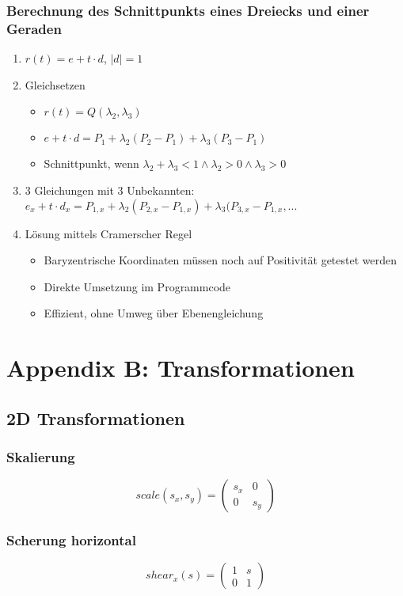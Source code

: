 \subsubsection{Berechnung des Schnittpunkts eines Dreiecks und einer Geraden}
\begin{enumerate}
	\item \(r(t) = e+t\cdot d\), \(|d|=1\)
	\item Gleichsetzen
	\begin{itemize}
		\item \(r(t) = Q(\lambda_2,\lambda_3)\)
		\item \(e+t\cdot d = P_1+\lambda_2(P_2-P_1)+\lambda_3(P_3-P_1)\)
		\item Schnittpunkt, wenn \(\lambda_2+\lambda_3<1 \wedge \lambda_2 > 0 \wedge \lambda_3 >0\)
	\end{itemize}
	\item 3 Gleichungen mit 3 Unbekannten: \(e_x+t\cdot d_x=P_{1,x}+\lambda_2(P_{2,x}-P_{1,x})+\lambda_3(P_{3,x}-P_{1,x},...\)
	\item Lösung mittels Cramerscher Regel
	\begin{itemize}
		\item Baryzentrische Koordinaten müssen noch auf Positivität getestet werden
		\item Direkte Umsetzung im Programmcode
		\item Effizient, ohne Umweg über Ebenengleichung
	\end{itemize}
\end{enumerate}



\section{Appendix B: Transformationen}

\subsection{2D Transformationen}

\subsubsection{Skalierung}
\[scale(s_x,s_y) = \begin{pmatrix} s_x & 0 \\ 0 & s_y \end{pmatrix}\]

\subsubsection{Scherung horizontal}
\[shear_x(s) = \begin{pmatrix} 1 & s \\ 0 & 1 \end{pmatrix}\]

